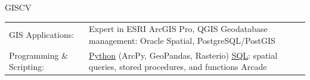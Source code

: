\documentclass[letterpaper]{article}
\newenvironment{skillslist}
        {
            \hspace*{-0.07in}\begin{tabular}[t]{ l L{5.17in} }
        }{
            \end{tabular}
        }
\newcommand{\impt}[1]{\uline{#1}}
\begin{document}
    \begin{taggedblock}{GISCV}
        \begin{skillslist}
            GIS Applications:&
                Expert in ESRI ArcGIS Pro, QGIS \linebreak
                Geodatabase management: Oracle Spatial, PostgreSQL/PostGIS \linebreak
                \\
            Programming \& Scripting:&
                \impt{Python} (ArcPy, GeoPandas, Rasterio) \linebreak
                \impt{SQL}: spatial queries, stored procedures, and functions \linebreak
                Arcade \linebreak

\end{skillslist}
\end{taggedblock}
\end{document}
